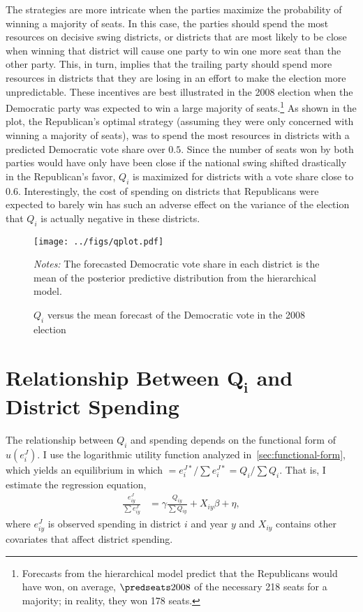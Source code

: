 \documentclass[12pt,final,fleqn]{article}
\theoremstyle{plain}
\begin{document}
The strategies are more intricate when the parties maximize the probability of winning a majority of seats. In this case, the parties should spend the most resources on decisive swing districts, or districts that are most likely to be close when winning that district will cause one party to win one more seat than the other party. This, in turn, implies that the trailing party should spend more resources in districts that they are losing in an effort to make the election more unpredictable. These incentives are best illustrated in the 2008 election when the Democratic party was expected to win a large majority of seats.\footnote{Forecasts from the hierarchical model predict that the Republicans would have won, on average, $\predseats2008$ of the necessary 218 seats for a majority; in reality, they won 178 seats.} As shown in the plot, the Republican's optimal strategy (assuming they were only concerned with winning a majority of seats), was to spend the most resources in districts with a predicted Democratic vote share over $0.5$. Since the number of seats won by both parties would have only have been close if the national swing shifted drastically in the Republican's favor, $Q_i$ is maximized for districts with a vote share close to $0.6$. Interestingly, the cost of spending on districts that Republicans were expected to barely win has such an adverse effect on the variance of the election that $Q_i$ is actually negative in these districts.
 
\begin{figure}[!htb]
\texttt{[image: ../figs/qplot.pdf]}
\vspace{.5cm}
\caption{$Q_i$ versus the mean forecast of the Democratic vote in the 2008 election}
\label{fig: $Q_i$ versus the mean forecast of the Democratic vote in the 2008 election}
\begin{minipage}{\linewidth}
\footnotesize
\emph{Notes:} The forecasted Democratic vote share in each district is the mean of the posterior predictive distribution from the hierarchical model.
\end{minipage}
\end{figure}

\section{Relationship Between $\mathbf{Q_i}$ and District Spending} \label{sec:actual-vs-optimal}
The relationship between $Q_i$ and spending depends on the functional form of $u(e^J_i)$. I use the logarithmic utility function analyzed in~\autoref{sec:functional-form}, which yields an equilibrium in which $=e_i^{J*}/\sum e_i^{J*} =Q_i/\sum Q_i$. That is, I estimate the regression equation,
\begin{align} \label{eqn: regression eqn}
\frac{e_{iy}^{J}}{\sum e_{iy}^{J}} &= \gamma \frac{Q_{iy}}{\sum Q_{iy}} + X_{iy}\beta + \eta,
\end{align} 
where $e_{iy}^{J}$ is observed spending in district $i$ and year $y$ and $X_{iy}$ contains other covariates that affect district spending.
 
\end{document}
